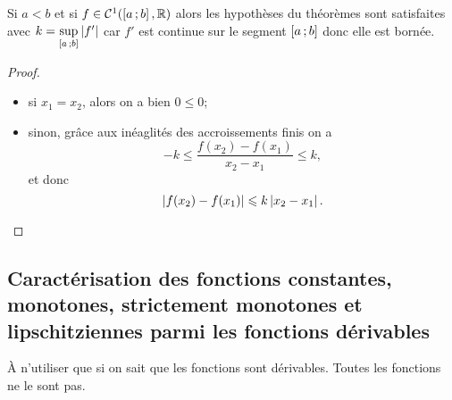 Si \(a < b\) et si \(f \in \mathcal{C}^{1}(\left[ a \, ;  b \right], \mathbb{R})\) alors les hypothèses du théorèmes sont satisfaites avec \(k=\sup\limits_{\left[ a \, ;  b \right]}\left\lvert f'\right\rvert\) car \(f'\) est continue sur le segment \(\left[ a \, ;  b \right]\) donc elle est bornée.

\begin{proof}
  \begin{itemize}
  \item si \(x_1=x_2\), alors on a bien \(0 \leqslant 0\);
  \item sinon, grâce aux inéaglités des accroissements finis on a
    \begin{equation}
      -k \leqslant \frac{f(x_2)-f(x_1)}{x_2-x_1} \leqslant k,
    \end{equation}
    et donc
    \begin{equation}
       \left\lvert f(x_2)-f(x_1)\right\rvert \leqslant k\left\lvert x_2-x_1\right\rvert.
    \end{equation}
  \end{itemize}
\end{proof}

\subsection{Caractérisation des fonctions constantes, monotones, strictement monotones et lipschitziennes parmi les fonctions dérivables}

À n'utiliser que si on sait que les fonctions sont dérivables. Toutes les fonctions ne le sont pas.

